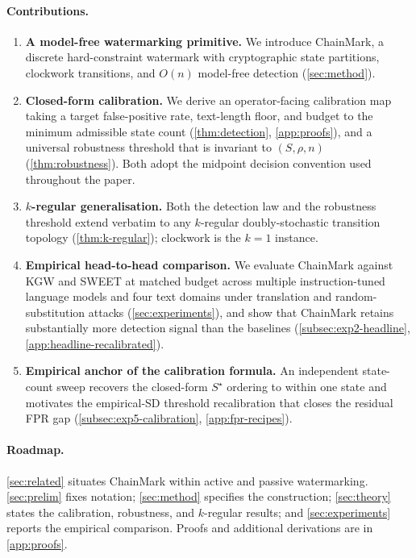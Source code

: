 \paragraph{Contributions.}
\begin{enumerate}[nosep, leftmargin=*]
  \item \textbf{A model-free watermarking primitive.} We introduce
    ChainMark, a discrete hard-constraint watermark with cryptographic
    state partitions, clockwork transitions, and $O(n)$ model-free
    detection (\autoref{sec:method}).
  \item \textbf{Closed-form calibration.} We derive an
    operator-facing calibration map taking a target false-positive
    rate, text-length floor, and budget to the minimum admissible
    state count (\autoref{thm:detection}, \autoref{app:proofs}),
    and a universal robustness threshold that is invariant to
    $(S, \rho, n)$ (\autoref{thm:robustness}). Both adopt the
    midpoint decision convention used throughout the paper.
  \item \textbf{$k$-regular generalisation.} Both the detection law
    and the robustness threshold extend verbatim to any $k$-regular
    doubly-stochastic transition topology
    (\autoref{thm:k-regular}); clockwork is the $k{=}1$ instance.
  \item \textbf{Empirical head-to-head comparison.} We evaluate ChainMark
    against KGW and SWEET at matched budget across multiple
    instruction-tuned language models and four text domains under
    translation and random-substitution attacks
    (\autoref{sec:experiments}), and show that ChainMark retains
    substantially more detection signal than the baselines
    (\autoref{subsec:exp2-headline}, \autoref{app:headline-recalibrated}).
  \item \textbf{Empirical anchor of the calibration formula.} An
    independent state-count sweep recovers the closed-form $S^\star$
    ordering to within one state and motivates the empirical-SD
    threshold recalibration that closes the residual FPR gap
    (\autoref{subsec:exp5-calibration}, \autoref{app:fpr-recipes}).
\end{enumerate}

\paragraph{Roadmap.}
\autoref{sec:related} situates ChainMark within active and passive
watermarking. \autoref{sec:prelim} fixes notation;
\autoref{sec:method} specifies the construction;
\autoref{sec:theory} states the calibration, robustness, and
$k$-regular results; and \autoref{sec:experiments} reports the
empirical comparison. Proofs and additional derivations are in
\autoref{app:proofs}.
